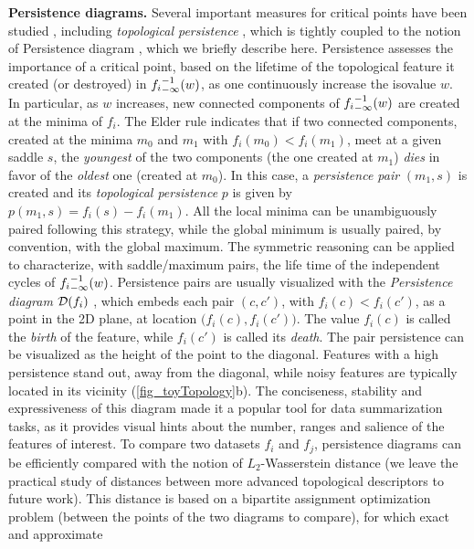 \noindent
\textbf{Persistence diagrams.}
Several important
measures for critical points have been studied \cite{carr04},
including \emph{topological persistence} \cite{edelsbrunner02}, which is tightly
coupled to the notion of Persistence diagram \cite{edelsbrunner09}, which we
briefly describe here.
Persistence
assesses the importance of a critical point, based on the
lifetime of the topological feature it created (or destroyed) in
 ${f_i}^{-1}_{-\infty}(w)$, as one continuously increase the isovalue $w$.
In particular, as $w$ increases, new connected components of
${f_i}^{-1}_{-\infty}(w)$ are created at the minima of $f_i$. The Elder rule
\cite{edelsbrunner09} indicates that if two connected
components, created at the minima $m_0$ and $m_1$ with $f_i(m_0) < f_i(m_1)$,
meet
at a given saddle $s$, the \emph{youngest} of the two components (the
one created at $m_1$) \emph{dies} in favor of the \emph{oldest} one (created at
$m_0$). In this case, a \emph{persistence pair} $(m_1, s)$ is created and
its
\emph{topological persistence} $p$ is given by $p(m_1, s) = f_i(s) - f_i(m_1)$.
All the local minima
can be
unambiguously
paired following this strategy, while the
global minimum is usually paired, by convention, with the global maximum.
The symmetric reasoning
can be applied to characterize, with saddle/maximum pairs, the life
time of the independent cycles of
${f_i}^{-1}_{-\infty}(w)$.
Persistence pairs are usually
visualized with the \emph{Persistence diagram} $\mathcal{D}(f_i)$
\cite{edelsbrunner09}, which embeds each pair $(c, c')$, with $f_i(c) <
f_i(c')$,
as a point in the 2D plane, at location $\big(f_i(c), f_i(c')\big)$.
The  value $f_i(c)$ is 
called the \emph{birth} of the
feature, while $f_i(c')$ is called its \emph{death}.
The
pair
persistence
can be
visualized as the height of the point to the diagonal.
Features with a high persistence stand out, away from the diagonal,
while noisy features are typically located in its vicinity 
(\autoref{fig_toyTopology}b).
The conciseness, stability \cite{edelsbrunner02} and expressiveness of this
diagram made it a popular tool
for data summarization tasks, as
it provides visual hints about the number, ranges and salience
of the features of interest.
To compare two datasets $f_i$ and $f_j$, persistence diagrams can be efficiently compared with the notion of $L_2$-Wasserstein distance \cite{CohenSteinerEH05,
Turner2014, Kerber2016} (we leave the practical study of distances between more
advanced topological descriptors  \cite{SridharamurthyM20,
pont_vis21} to future work). This distance is based on a bipartite assignment optimization problem (between the points of the two diagrams to compare), for which exact \cite{Munkres1957} and approximate \cite{Bertsekas81}
